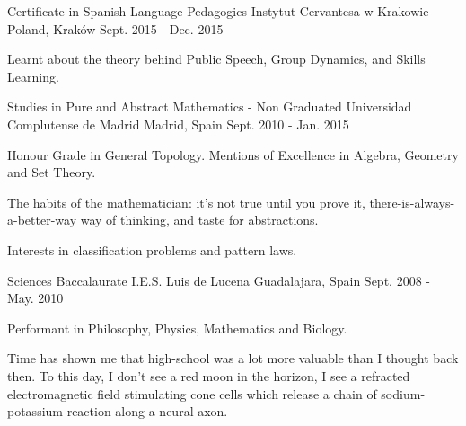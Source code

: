 
\begin{cventries}
  \cventry
    {Certificate in Spanish Language Pedagogics} %
    {Instytut Cervantesa w Krakowie} %
    {Poland, Kraków} %
    {Sept. 2015 - Dec. 2015} %
    {
        \begin{cvitems} %
            \item {Learnt about the theory behind Public Speech, Group Dynamics, and Skills Learning.}
        \end{cvitems}
    }

\cventry
    {Studies in Pure and Abstract Mathematics - Non Graduated} %
    {Universidad Complutense de Madrid} %
    {Madrid, Spain} %
    {Sept. 2010 - Jan. 2015} %
    {
        \begin{cvitems} %
            \item {Honour Grade in General Topology. Mentions of Excellence in Algebra, Geometry and Set Theory.}
            \item {The habits of the mathematician: it's not true until you prove it, there-is-always-a-better-way way of thinking, and taste for abstractions.}
            \item {Interests in classification problems and pattern laws.}
        \end{cvitems}
    }

\cventry
    {Sciences Baccalaurate} %
    {I.E.S. Luis de Lucena} %
    {Guadalajara, Spain} %
    {Sept. 2008 - May. 2010} %
    {
        \begin{cvitems} %
            \item {Performant in Philosophy, Physics, Mathematics and Biology.}
            \item {Time has shown me that high-school was a lot more valuable than I thought back then. To this day, I don't see a red moon in the horizon, I see a refracted electromagnetic field stimulating cone cells which release a chain of sodium-potassium reaction along a neural axon.}
        \end{cvitems}
    }

\end{cventries}
